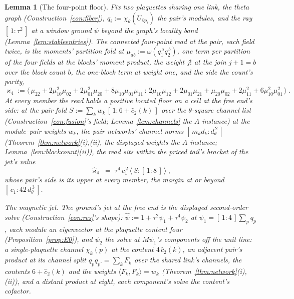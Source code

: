 \documentclass[11pt]{article}
\newtheorem{lemma}{Lemma}
\theoremstyle{definition}
\begin{document}
\begin{lemma}[The four-point floor]\label{lem:fourpoint}
Fix two plaquettes sharing one link, the theta graph
(Construction~\ref{con:fiber}), $q_i:=\chi_\theta(U_{\partial p_i})$
the pair's modules, and the ray $[\,1:\tau^2\,]$ at a window
ground $\psi$ beyond the graph's locality band
(Lemma~\ref{lem:stableentries}). The \emph{connected four-point
read} at the pair, each field twice, is the moments' partition
fold at $\mu_{ab}:=\omega(q_1^{\,a}q_2^{\,b})$, one term per
partition of the four fields at the blocks' moment product, the
weight $j!$ at the join $j+1=b$ over the block count $b$, the
one-block term at weight one, and the side the
count's parity,
\[
\varkappa_4:=\big\langle\,
\mu_{22}+2\mu_{10}^2\mu_{02}+2\mu_{01}^2\mu_{20}
+8\mu_{10}\mu_{01}\mu_{11}
\,:\,
2\mu_{10}\mu_{12}+2\mu_{01}\mu_{21}+\mu_{20}\mu_{02}
+2\mu_{11}^2+6\mu_{10}^2\mu_{01}^2
\,\big\rangle\ .
\]
At every member the read holds a positive located floor on a cell
at the free end's side: at the \emph{pair fold}
$S:=\sum_kw_k\,[\,1:6+\hat c_2(k)\,]$ over the $\theta$-square
channel list (Construction~\ref{con:fusion}'s field;
Lemma~\ref{lem:channels} the $A$ instance) at the module--pair
weights $w_k$, the pair networks' channel norms
$[\,m_kd_k:d_\theta^{\,2}\,]$ (Theorem~\ref{thm:network}(i),(ii),
the displayed weights the $A$ instance;
Lemma~\ref{lem:blockcount}(ii)), the read sits
within the priced tail's bracket of the jet's value
\[
\hat\varkappa_4\;=\;\tau^4\,c_1^{\,2}\,
\big\langle\,S:[\,1:8\,]\,\big\rangle\ ,
\]
whose pair's side is its upper at every member, the margin at or
beyond $[\,c_1:42\,d_\theta^{\,3}\,]$.

\emph{The magnetic jet.} The ground's jet at the free end is the
displayed second-order solve (Construction~\ref{con:res}'s shape):
$\hat\psi:=1+\tau^2\psi_1+\tau^4\psi_2$ at
$\psi_1=[\,1:4\,]\sum_pq_p$, each module an eigenvector at the
plaquette content four (Proposition~\ref{prop:E0}), and $\psi_2$
the solve at $M\psi_1$'s components off the unit line: a
single-plaquette channel $\chi_k(p)$ at the content
$4\,\hat c_2(k)$, an adjacent pair's product at its channel split
$q_pq_{p'}=\sum_kF_k$ over the shared link's channels, the
contents $6+\hat c_2(k)$ and the weights
$\langle F_k,F_k\rangle=w_k$ (Theorem~\ref{thm:network}(i),(ii)),
and a distant product at eight, each component's solve the
content's cofactor.


\end{lemma}
\end{document}
